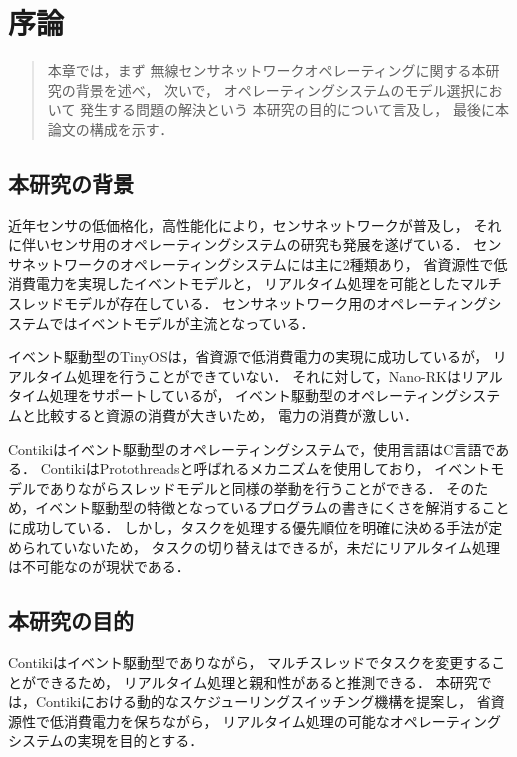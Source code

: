 \chapter{序論}
\begin{large}
\begin{quote}
本章では，まず
無線センサネットワークオペレーティングに関する本研究の背景を述べ，
次いで，
オペレーティングシステムのモデル選択において
発生する問題の解決という
本研究の目的について言及し，
最後に本論文の構成を示す．
\end{quote}
\end{large}
\clearpage

\section{本研究の背景}
近年センサの低価格化，高性能化により，センサネットワークが普及し，
それに伴いセンサ用のオペレーティングシステムの研究も発展を遂げている．
センサネットワークのオペレーティングシステムには主に2種類あり，
省資源性で低消費電力を実現したイベントモデルと，
リアルタイム処理を可能としたマルチスレッドモデルが存在している．
センサネットワーク用のオペレーティングシステムではイベントモデルが主流となっている．

イベント駆動型のTinyOSは，省資源で低消費電力の実現に成功しているが，
リアルタイム処理を行うことができていない．
それに対して，Nano-RKはリアルタイム処理をサポートしているが，
イベント駆動型のオペレーティングシステムと比較すると資源の消費が大きいため，
電力の消費が激しい．

Contikiはイベント駆動型のオペレーティングシステムで，使用言語はC言語である．
ContikiはProtothreadsと呼ばれるメカニズムを使用しており，
イベントモデルでありながらスレッドモデルと同様の挙動を行うことができる．
そのため，イベント駆動型の特徴となっているプログラムの書きにくさを解消することに成功している．
しかし，タスクを処理する優先順位を明確に決める手法が定められていないため，
タスクの切り替えはできるが，未だにリアルタイム処理は不可能なのが現状である．


\section{本研究の目的}
Contikiはイベント駆動型でありながら，
マルチスレッドでタスクを変更することができるため，
リアルタイム処理と親和性があると推測できる．
本研究では，Contikiにおける動的なスケジューリングスイッチング機構を提案し，
省資源性で低消費電力を保ちながら，
リアルタイム処理の可能なオペレーティングシステムの実現を目的とする．


